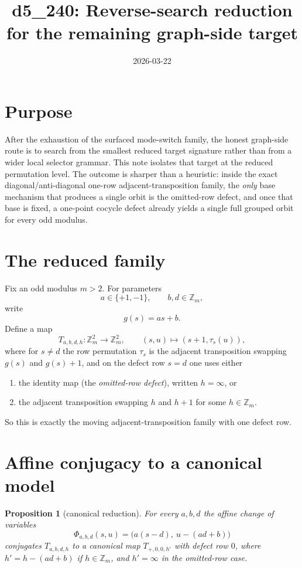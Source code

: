 \documentclass[11pt]{article}
\title{d5\_240: Reverse-search reduction for the remaining graph-side target}
\author{}
\date{2026-03-22}
\newtheorem{proposition}[theorem]{Proposition}
\begin{document}
\maketitle

\section{Purpose}
After the exhaustion of the surfaced mode-switch family, the honest graph-side
route is to search from the smallest reduced target signature rather than from a
wider local selector grammar.
This note isolates that target at the reduced permutation level.
The outcome is sharper than a heuristic: inside the exact diagonal/anti-diagonal
one-row adjacent-transposition family, the \emph{only} base mechanism that
produces a single orbit is the omitted-row defect, and once that base is fixed,
a one-point cocycle defect already yields a single full grouped orbit for every
odd modulus.

\section{The reduced family}
Fix an odd modulus $m>2$.
For parameters
\[
 a\in\{+1,-1\},\qquad b,d\in\mathbb Z_m,
\]
write
\[
 g(s)=as+b.
\]
Define a map
\[
 T_{a,b,d,h}\colon \mathbb Z_m^2\to\mathbb Z_m^2,
 \qquad (s,u)\mapsto (s+1,\tau_s(u)),
\]
where for $s\neq d$ the row permutation $\tau_s$ is the adjacent transposition
swapping $g(s)$ and $g(s)+1$, and on the defect row $s=d$ one uses either
\begin{enumerate}[label=\textup{(\roman*)},leftmargin=2.5em]
\item the identity map (the \emph{omitted-row defect}), written $h=\infty$, or
\item the adjacent transposition swapping $h$ and $h+1$ for some $h\in\mathbb Z_m$.
\end{enumerate}
So this is exactly the moving adjacent-transposition family with one defect row.

\section{Affine conjugacy to a canonical model}
\begin{proposition}[canonical reduction]
\label{prop:canonical-reduction}
For every $a,b,d$ the affine change of variables
\[
 \Phi_{a,b,d}(s,u)=\bigl(a(s-d),\ u-(ad+b)\bigr)
\]
conjugates $T_{a,b,d,h}$ to a canonical map $T_{+,0,0,h'}$ with defect row $0$,
where $h'=h-(ad+b)$ if $h\in\mathbb Z_m$, and $h'=\infty$ in the omitted-row
case.
\end{proposition}
\end{document}
